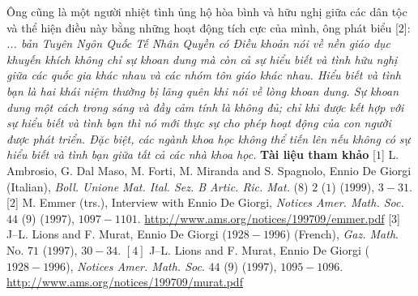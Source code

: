 \begin{multicols}{2}
\begin{figure}[H]
			\vspace*{-15pt}
		\end{figure}
	Ông cũng là một người nhiệt tình ủng hộ hòa bình và hữu nghị giữa các dân tộc và thể hiện điều này bằng những hoạt động tích cực của mình, ông phát biểu [$2$]:
	\vskip 0.1cm
	\textit{... bản Tuyên Ngôn Quốc Tế Nhân Quyền có Điều khoản nói về nền giáo dục khuyến khích không chỉ sự khoan dung mà còn cả sự hiểu biết và tình hữu nghị giữa các quốc gia khác nhau và các nhóm tôn giáo khác nhau. Hiểu biết và tình bạn là hai khái niệm thường bị lãng quên khi nói về lòng khoan dung. Sự khoan dung một cách trong sáng và đầy cảm tính là không đủ; chỉ khi được kết hợp với sự hiểu biết và tình bạn thì nó mới thực sự cho phép hoạt động của con người được phát triển. Đặc biệt, các ngành khoa học không thể tiến lên nếu không có sự hiểu biết và tình bạn giữa tất cả các nhà khoa học.}
	\vskip 0.1cm
	\textbf{\color{quantoan}Tài liệu tham khảo}
	\vskip 0.1cm
	[$1$]	L. Ambrosio, G. Dal Maso, M. Forti, M. Miranda and S. Spagnolo, Ennio De Giorgi (Italian), \textit{Boll. Unione Mat. Ital. Sez. B Artic. Ric. Mat.} ($8$) $2$ ($1$) ($1999$), $3-31$.
	\vskip 0.1cm
	[$2$]	M. Emmer (trs.), Interview with Ennio De Giorgi, \textit{Notices Amer. Math. Soc.} $44$ ($9$) ($1997$), $1097-1101$. \url{http://www.ams.org/notices/199709/emmer.pdf}
	\vskip 0.1cm
	[$3$]	J--L. Lions and F. Murat, Ennio De Giorgi ($1928-1996$) (French), \textit{Gaz. Math}. No. $71$ ($1997$), $30-34$.
	\vskip 0.1cm
	$[4]$	J--L. Lions and F. Murat, Ennio De Giorgi ($1928-1996$), \textit{Notices Amer. Math. Soc}. $44$ ($9$) ($1997$), $1095-1096$. \url{http://www.ams.org/notices/199709/murat.pdf}
\end{multicols}
\newpage
\begingroup
